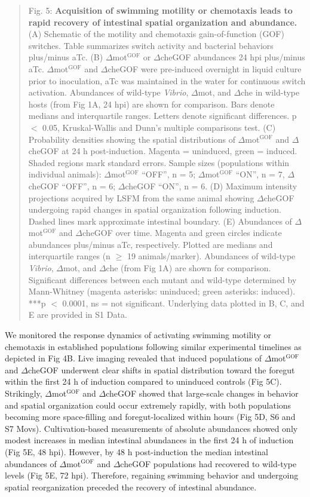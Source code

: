 \begin{quote}
Fig. 5: \textbf{Acquisition of swimming motility or chemotaxis leads to rapid recovery of intestinal spatial organization and abundance.} (A) Schematic of the motility and chemotaxis gain-of-function (GOF) switches. Table summarizes switch activity and bacterial behaviors plus/minus aTc. (B) $\Delta$mot$^{\text{GOF}}$ or $\Delta$cheGOF abundances 24 hpi plus/minus aTc. $\Delta$mot$^{\text{GOF}}$ and $\Delta$cheGOF were pre-induced overnight in liquid culture prior to inoculation, aTc was maintained in the water for continuous switch activation. Abundances of wild-type \textit{Vibrio}, $\Delta$mot, and $\Delta$che in wild-type hosts (from Fig 1A, 24 hpi) are shown for comparison. Bars denote medians and interquartile ranges. Letters denote significant differences. p $ < $ 0.05, Kruskal-Wallis and Dunn's multiple comparisons test. (C) Probability densities showing the spatial distributions of $\Delta$mot$^{\text{GOF}}$ and $\Delta$cheGOF at 24 h post-induction. Magenta = uninduced, green = induced. Shaded regions mark standard errors. Sample sizes (populations within individual animals): $\Delta$mot$^{\text{GOF}}$ ``OFF'', n = 5; $\Delta$mot$^{\text{GOF}}$ ``ON'', n = 7, $\Delta$cheGOF ``OFF'', n = 6; $\Delta$cheGOF ``ON'', n = 6. (D) Maximum intensity projections acquired by LSFM from the same animal showing $\Delta$cheGOF undergoing rapid changes in spatial organization following induction. Dashed lines mark approximate intestinal boundary. (E) Abundances of $\Delta$mot$^{\text{GOF}}$ and $\Delta$cheGOF over time. Magenta and green circles indicate abundances plus/minus aTc, respectively. Plotted are medians and interquartile ranges (n $\ge$ 19 animals/marker). Abundances of wild-type \textit{Vibrio}, $\Delta$mot, and $\Delta$che (from Fig 1A) are shown for comparison. Significant differences between each mutant and wild-type determined by Mann-Whitney (magenta asterisks: uninduced; green asterisks: induced). ***p $ < $ 0.0001, ns = not significant. Underlying data plotted in B, C, and E are provided in S1 Data.
\end{quote}

We monitored the response dynamics of activating swimming motility or chemotaxis in established populations following similar experimental timelines as depicted in Fig 4B. Live imaging revealed that induced populations of $\Delta$mot$^{\text{GOF}}$ and $\Delta$cheGOF underwent clear shifts in spatial distribution toward the foregut within the first 24 h of induction compared to uninduced controls (Fig 5C). Strikingly, $\Delta$mot$^{\text{GOF}}$ and $\Delta$cheGOF showed that large-scale changes in behavior and spatial organization could occur extremely rapidly, with both populations becoming more space-filling and foregut-localized within hours (Fig 5D, S6 and S7 Movs). Cultivation-based measurements of absolute abundances showed only modest increases in median intestinal abundances in the first 24 h of induction (Fig 5E, 48 hpi). However, by 48 h post-induction the median intestinal abundances of $\Delta$mot$^{\text{GOF}}$ and $\Delta$cheGOF populations had recovered to wild-type levels (Fig 5E, 72 hpi). Therefore, regaining swimming behavior and undergoing spatial reorganization preceded the recovery of intestinal abundance. 

